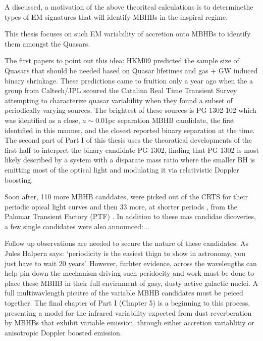A discussed, a motivation of the above theoritcal calculations is to determinethe types of EM signatures that will identify MBHBs in the inspiral regime.

This thesis focuses on such EM variability of accretion onto MBHBs to identify
them amongst the Quasars.



The first papers to point out this idea: HKM09 predicted the sample size of
Quasars that should be needed based on Quasar lifetimes and gas + GW induced
binary shrinkage. These predictions came to fruition only a year ago when the
a group from Caltech/JPL scoured the Catalina Real Time Transient Survey
\citep{CRTS refs} attempting to characterize quasar variability when they
found a subset of periodically varying sources. The brightest of these sources
is PG 1302-102 which was identified as a close, $a \sim 0.01$pc separation
MBHB candidate, the first identified in this manner, and the closest reported
binary separation at the time. The second part of Part I of this thesis uses
the theoratical developments of the first half to interpret the binary
candidate PG 1302, finding that PG 1302 is most likely described by a system
with a disparate mass ratio where the smaller BH is emitting most of the
optical light and modulating it via relativistic Doppler boosting.


Soon after, 110 more MBHB canddates, were picked out of the CRTS for their
periodic opical light curves \citep{Graham:2015b} and then 33 more, at shorter
periods \citep{CharisiMBHBs:2016}, from the Palomar Transient Factory (PTF)
\citep{PTF}. In addition to these mas candidae dicoveries, a few single
candidates were also announced:...


Follow up observations are needed to secure the nature of these candidates. As
Jules Halpern says: `periodicity is the easiest thign to show in astronomy,
you just have to wait 20 years'. However, furhter evidence, across the
wavelengths can help pin down the mechanism driving such peridocity and work
must be done to place these MBHB in their full envirnment of gasy, dusty
active galactic nuclei. A full multiwavlength picutre of the variable MBHB
candidates must be peiced together. The final chapter of Part I (Chapter 5) is
a beginning to this process, presenting a model for the infrared variability
expected from dust reverberation by MBHBs that exhibit variable emission,
through either accretion variablitiy or anisotropic Doppler boosted emission.











